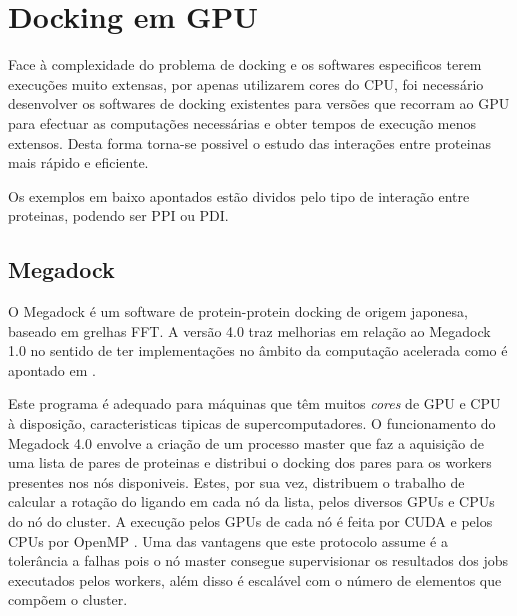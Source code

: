 \section{Docking em GPU}
\label{gpus1}
Face à complexidade do problema de docking e os softwares especificos terem execuções muito extensas, por apenas utilizarem cores do CPU, foi necessário desenvolver os softwares de docking existentes para versões que recorram ao GPU para efectuar as computações necessárias e obter tempos de execução menos extensos. Desta forma torna-se possivel o estudo das interações entre proteinas mais rápido e eficiente. \par
Os exemplos em baixo apontados estão dividos pelo tipo de interação entre proteinas, podendo ser PPI ou PDI. 

\subsection {Megadock}
\label{megaD}
O Megadock é um software de protein-protein docking de origem japonesa, baseado em grelhas FFT. A versão 4.0\cite{megadock40} traz melhorias em relação ao Megadock 1.0 no sentido de ter implementações no âmbito da computação acelerada como é apontado em \cite{megadock}.

Este programa é adequado para máquinas que têm muitos \textit{cores} de GPU e CPU à disposição, caracteristicas tipicas de supercomputadores.
O funcionamento do Megadock 4.0 envolve a criação de um processo master que faz a aquisição de uma lista de pares de proteinas e distribui o docking dos pares para os workers presentes nos nós disponiveis.
 Estes, por sua vez, distribuem o trabalho de calcular a rotação do ligando em cada nó da lista, pelos diversos GPUs e CPUs do nó do cluster. A execução pelos GPUs de cada nó é feita por CUDA e pelos CPUs por OpenMP . 
 Uma das vantagens que este protocolo assume é a tolerância a falhas pois o nó master consegue supervisionar os resultados dos jobs executados pelos workers, além disso é escalável com o número de elementos que compõem o cluster.

